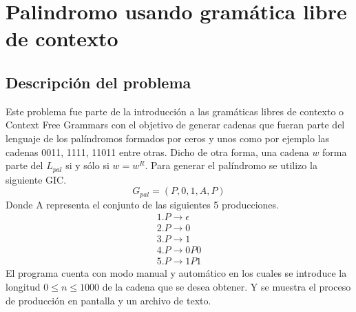 \section{Palindromo usando gramática libre de contexto}
	\subsection{Descripción del problema}
	Este problema fue parte de la introducción a las gramáticas libres de contexto o Context Free Grammars con el objetivo de generar cadenas que fueran parte del lenguaje de los palíndromos formados por ceros y unos como por ejemplo las cadenas 0011, 1111, 11011 entre otras. Dicho de otra forma, una cadena $w$ forma parte del $ L_{pal}$ si y sólo si $w=w^R$.
	Para generar el palíndromo se utilizo la siguiente GIC.\cite{LIBRO}
	\[ G_{pal} = ({P},{0,1},A,P) \]
	Donde A representa el conjunto de las siguientes 5 producciones.
	\begin{gather*}
	1. P\to \epsilon \\
	2. P\to 0 \\
	3. P\to 1 \\
	4. P\to 0P0 \\
	5. P\to 1P1
	\end{gather*}
	El programa cuenta con modo manual y automático en los cuales se introduce la longitud $0 \le n \le 1000 $ de la cadena que se desea obtener. Y se muestra el proceso de producción en pantalla y un archivo de texto.
